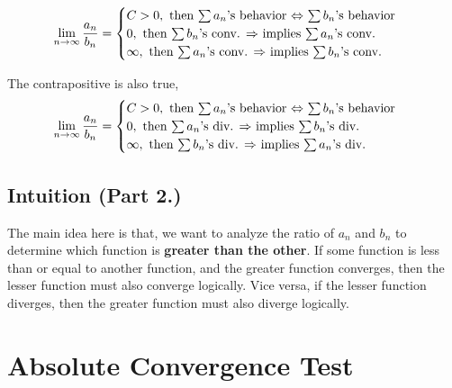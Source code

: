 \documentclass{report}
\begin{document}
\begin{sloppypar}
\begin{center}
{{      \[ \lim_{n \rightarrow \infty} \frac{a_{n}}{b_{n}} =
        \begin{cases}
          C > 0, ~ \textrm{then $ \sum a_{n} $'s behavior $ \Leftrightarrow $
          $ \sum b_{n} $'s behavior } \\
          0, ~ \textrm{then $ \sum b_{n} $'s conv. $ \Rightarrow $ implies $ \sum a_{n}$'s conv.}  \\
          \infty, ~ \textrm{then $ \sum a_{n} $'s conv.
          $ \Rightarrow$ implies $ \sum b_{n} $'s conv. }
        \end{cases}\]

      The contrapositive is also true,
            \[
        \lim_{n \rightarrow \infty} \frac{a_{n}}{b_{n}} =
        \begin{cases}
          C > 0, ~ \textrm{then $ \sum a_{n} $'s behavior $ \Leftrightarrow $
          $ \sum b_{n} $'s behavior } \\
          0, ~ \textrm{then $ \sum a_{n} $'s div. $ \Rightarrow $ implies $ \sum b_{n}$'s div.}  \\
          \infty, ~ \textrm{then $ \sum b_{n} $'s div.
          $ \Rightarrow$ implies $ \sum a_{n} $'s div. }
        \end{cases}
      \]
    }}
\end{center}

      \subsection{Intuition (Part 2.)}
      The main idea here is that, we want to analyze the ratio
      of $ a_{n} $ and $ b_{n}$  to determine which function is
      \textbf{greater than the other}. If some function is less than or
      equal to another function, and the greater function converges,
      then the lesser function must also converge logically. Vice
      versa, if the lesser function diverges, then the greater
      function must also diverge logically.


\section{Absolute Convergence Test}
\begin{center}
\end{center}
\end{sloppypar}
\end{document}
